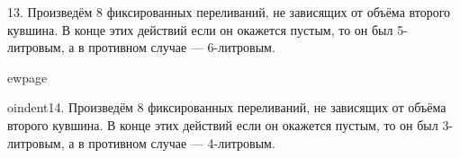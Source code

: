 13. Произведём 8 фиксированных переливаний, не зависящих от объёма второго кувшина. В конце этих действий если он окажется пустым, то он был 5-литровым, а в противном случае --- 6-литровым.
\begin{center}
\begin{figure}[h!]
\end{figure}
\end{center}

ewpage

oindent14. Произведём 8 фиксированных переливаний, не зависящих от объёма второго кувшина. В конце этих действий если он окажется пустым, то он был 3-литровым, а в противном случае --- 4-литровым.
\begin{center}
\begin{figure}[h!]
\end{figure}
\end{center}
